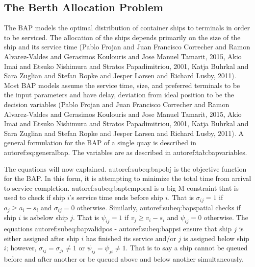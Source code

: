 \documentclass[11pt,a4paper,final]{article}
\begin{document}
\subsection{The Berth Allocation Problem}
\label{sec:org08dc923}
The BAP models the optimal distribution of container ships to terminals in order to be serviced. The allocation of the
ships depends primarily on the size of the ship and its service time
(Pablo Frojan and Juan Francisco Correcher and Ramon Alvarez-Valdes and Gerasimos Koulouris and Jose Manuel Tamarit, 2015, Akio Imai and Etsuko Nishimura and Stratos Papadimitriou, 2001, Katja Buhrkal and Sara Zuglian and Stefan Ropke and Jesper Larsen and Richard Lusby, 2011). Most BAP models assume the service
time, size, and preferred terminals to be the input parameters and have delay, deviation from ideal position to be the decision
variables (Pablo Frojan and Juan Francisco Correcher and Ramon Alvarez-Valdes and Gerasimos Koulouris and Jose Manuel Tamarit, 2015, Akio Imai and Etsuko Nishimura and Stratos Papadimitriou, 2001, Katja Buhrkal and Sara Zuglian and Stefan Ropke and Jesper Larsen and Richard Lusby, 2011). A general formulation for the
BAP of a single quay is described in autoref:eq:generalbap. The variables are as described in autoref:tab:bapvariables.

The equations will now explained. autoref:subeq:bapobj is the objective function for the BAP. In this form, it is
attempting to minimize the total time from arrival to service completion. autoref:subeq:baptemporal is a big-M
constraint that is used to check if ship \(i\)'s service time ends before ship \(i\). That is \(\sigma_{ij}=1\) if \(a_j \ge a_i -
s_i\) and \(\sigma_{ij} = 0\) otherwise. Similarly, autoref:subeq:bapspatial checks if ship \(i\) is asbelow ship \(j\). That is
\(\psi_{ij} = 1\) if \(v_j \ge v_i - s_i\) and \(\psi_{ij} = 0\) otherwise. The equations autoref:subeq:bapvalidpos -
autoref:subeq:bappsi ensure that ship \(j\) is either assigned after ship \(i\) has finished its service and/or \(j\) is
assigned below ship \(i\); however, \(\sigma_{ij} = \sigma_{ji} \ne 1\) or \(\psi_{ij} = \psi_{ji} \ne 1\). That is to say a ship cannot be queued
before and after another or be queued above and below another simultaneously.
\end{document}
